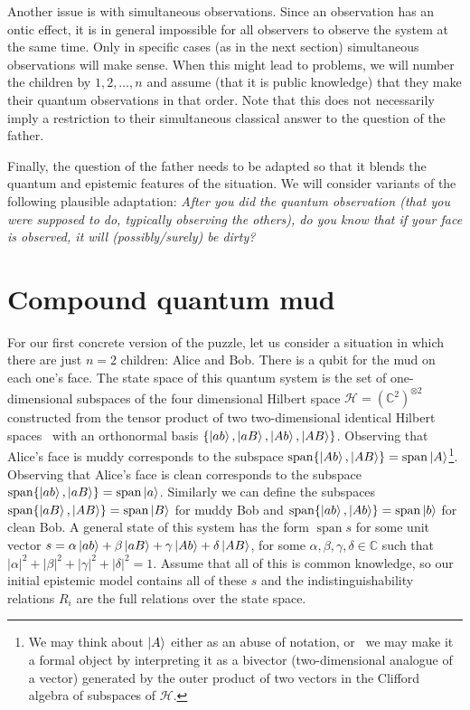 \documentclass[a4paper]{article}
\newcommand{\HH}{\mathcal{H}}
\newcommand{\CC}{\mathbb{C}}
\DeclareMathOperator{\spn}{span}
\begin{document}
Another issue is with simultaneous observations. Since an observation has an
ontic effect, it is in general impossible for all observers to observe the
system at the same time. Only in specific cases (as in the next section)
simultaneous observations will make sense. When this might lead to problems, we
will number the children by $1, 2, \dots, n$ and assume (that it is public
knowledge) that they make their quantum observations in that order. Note that
this does not necessarily imply a restriction to their simultaneous classical
answer to the question of the father.

Finally, the question of the father needs to be adapted so that it blends the
quantum and epistemic features of the situation. We will consider variants of 
the following plausible adaptation:
\emph{After you did the quantum observation (that you were supposed to do,
    typically observing the others), do you know that if your face is observed,
it will (possibly/surely) be dirty?}

\section*{Compound quantum mud}
For our first concrete version of the puzzle, let us consider a situation in
which there are just $n = 2$ children: Alice and Bob. There is a qubit for the
mud on each one's face. The state space of this quantum system is the set of
one-dimensional subspaces of the four dimensional Hilbert space $\HH =
(\CC^2)^{\otimes 2}$
constructed from the tensor product of two two-dimensional identical Hilbert
spaces~\cite{lqp22} with an
orthonormal basis $\{\ket{ab}, \ket{aB}, \ket{Ab}, \ket{AB}\}$. Observing that
Alice's face is muddy corresponds to the subspace $\spn\{\ket{Ab},\ket{AB}\} =
\spn\ket{A}$\footnote{We may think about $\ket{A}$ either as an abuse of
notation, or~\cite{geomcs} we may make it a formal object by interpreting it as
a bivector (two-dimensional analogue of a vector) generated by the outer product
of two vectors in the Clifford algebra of subspaces of $\HH$.}.  Observing that
Alice's face is clean corresponds to the subspace $\spn\{\ket{ab},\ket{aB}\} =
\spn\ket{a}$. Similarly we can define the subspaces $\spn\{\ket{aB}, \ket{AB}\}
= \spn\ket{B}$ for muddy Bob and $\spn\{\ket{ab},\ket{Ab}\} = \spn\ket{b}$ for
clean Bob. A general state of this system has the form $\spn{s}$ for some unit
vector $s = \alpha\ket{ab} + \beta\ket{aB} + \gamma\ket{Ab} + \delta\ket{AB}$,
for some $\alpha, \beta, \gamma, \delta \in \CC$ such that $|\alpha|^2 +
|\beta|^2 + |\gamma|^2 + |\delta|^2 = 1$.  Assume that all of this is common
knowledge, so our initial epistemic model contains all of these $s$ and the
indistinguishability relations $R_i$ are the full relations over the state
space.
\end{document}
